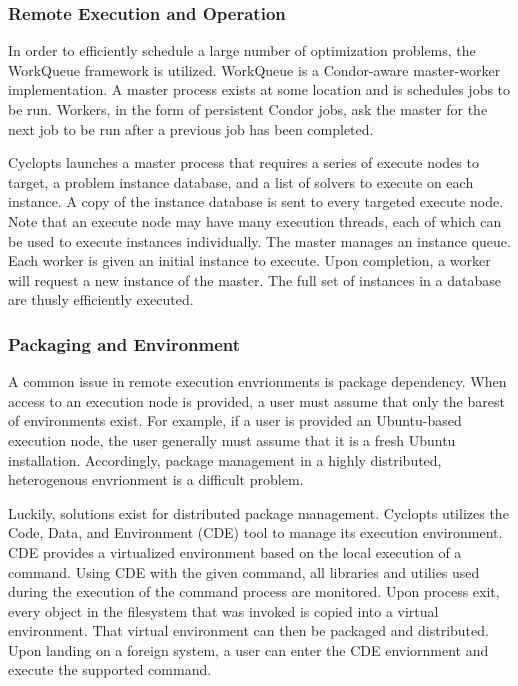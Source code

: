 \subsubsection{Remote Execution and Operation}

In order to efficiently schedule a large number of optimization problems, the
WorkQueue framework \cite{bui_work_2011} is utilized. WorkQueue is a
Condor-aware master-worker implementation. A master process exists at some
location and is schedules jobs to be run. Workers, in the form of persistent
Condor jobs, ask the master for the next job to be run after a previous job has
been completed.

Cyclopts launches a master process that requires a series of execute nodes to
target, a problem instance database, and a list of solvers to execute on each
instance. A copy of the instance database is sent to every targeted execute
node. Note that an execute node may have many execution threads, each of which
can be used to execute instances individually. The master manages an instance
queue. Each worker is given an initial instance to execute. Upon completion, a
worker will request a new instance of the master. The full set of instances in a
database are thusly efficiently executed.

\subsubsection{Packaging and Environment}

A common issue in remote execution envrionments is package dependency. When
access to an execution node is provided, a user must assume that only the barest
of environments exist. For example, if a user is provided an Ubuntu-based
execution node, the user generally must assume that it is a fresh Ubuntu
installation. Accordingly, package management in a highly distributed,
heterogenous envrionment is a difficult problem.

Luckily, solutions exist for distributed package management. Cyclopts utilizes
the Code, Data, and Environment (CDE) \cite{cde} tool to manage its execution
environment. CDE provides a virtualized environment based on the local execution
of a command. Using CDE with the given command, all libraries and utilies used
during the execution of the command process are monitored. Upon process exit,
every object in the filesystem that was invoked is copied into a virtual
environment. That virtual environment can then be packaged and distributed. Upon
landing on a foreign system, a user can enter the CDE enviornment and execute
the supported command.

